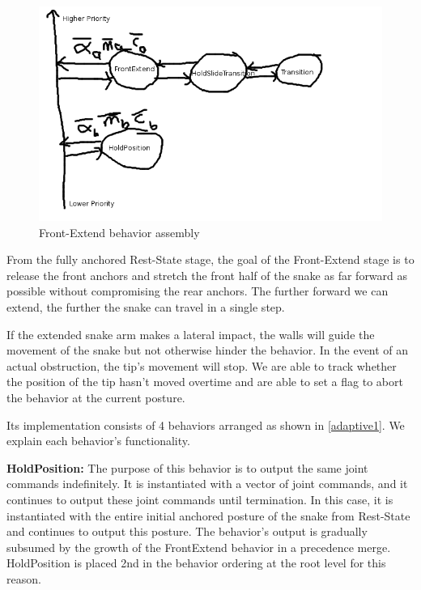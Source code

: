 

\begin{figure}[htbp]
\centering
\includegraphics[keepaspectratio,width=400pt,height=0.75\textheight]{2_adaptive_1.png}
\caption{Front-Extend behavior assembly}
\label{adaptive1}
\end{figure}






From the fully anchored Rest-State stage, the goal of the Front-Extend stage is to release the front anchors and stretch the front half of the snake as far forward as possible without compromising the rear anchors. The further forward we can extend, the further the snake can travel in a single step.

If the extended snake arm makes a lateral impact, the walls will guide the movement of the snake but not otherwise hinder the behavior. In the event of an actual obstruction, the tip's movement will stop. We are able to track whether the position of the tip hasn't moved overtime and are able to set a flag to abort the behavior at the current posture.

Its implementation consists of 4 behaviors arranged as shown in \autoref{adaptive1}. We explain each behavior's functionality.

\textbf{HoldPosition:} The purpose of this behavior is to output the same joint commands indefinitely. It is instantiated with a vector of joint commands, and it continues to output these joint commands until termination. In this case, it is instantiated with the entire initial anchored posture of the snake from Rest-State and continues to output this posture. The behavior's output is gradually subsumed by the growth of the FrontExtend behavior in a precedence merge. HoldPosition is placed 2nd in the behavior ordering at the root level for this reason.

